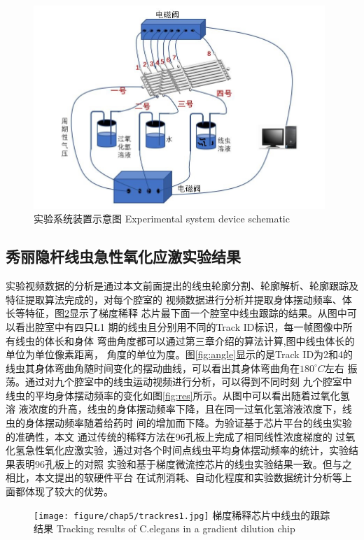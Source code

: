 	\begin{figure}[!t]
	  \centering
	  \includegraphics[width=11cm]{figure/chap5/hardware.jpg}
	  \bicaption
		{实验系统装置示意图}
		{Experimental system device schematic}
	  \label{fig:sysdevice}
	\end{figure}

\subsection{秀丽隐杆线虫急性氧化应激实验结果}
	实验视频数据的分析是通过本文前面提出的线虫轮廓分割、轮廓解析、轮廓跟踪及特征提取算法完成的，对每个腔室的
	视频数据进行分析并提取身体摆动频率、体长等特征，图\ref{fig:trackres}显示了梯度稀释
	芯片最下面一个腔室中线虫跟踪的结果。从图中可以看出腔室中有四只L1
	期的线虫且分别用不同的Track ID标识，每一帧图像中所有线虫的体长和身体
	弯曲角度都可以通过第三章介绍的算法计算,图中线虫体长的单位为单位像素距离，
	角度的单位为度。图\ref{fig:angle}显示的是Track ID为2和4的
	线虫其身体弯曲角随时间变化的摆动曲线，可以看出其身体弯曲角在$180^\circ C$左右
	振荡。通过对九个腔室中的线虫运动视频进行分析，可以得到不同时刻
	九个腔室中线虫的平均身体摆动频率的变化如图\ref{fig:res}所示。从图中可以看出随着过氧化氢溶
	液浓度的升高，线虫的身体摆动频率下降，且在同一过氧化氢溶液浓度下，线虫的身体摆动频率随着给药时
	间的增加而下降。为验证基于芯片平台的线虫实验的准确性，本文
	通过传统的稀释方法在96孔板上完成了相同线性浓度梯度的
	过氧化氢急性氧化应激实验，通过对各个时间点线虫平均身体摆动频率的统计，实验结果表明96孔板上的对照
	实验和基于梯度微流控芯片的线虫实验结果一致。但与之相比，本文提出的软硬件平台
	在试剂消耗、自动化程度和实验数据统计分析等上面都体现了较大的优势。
	\begin{figure}[H]
	  \centering
	  \texttt{[image: figure/chap5/trackres1.jpg]}
	  \bicaption
		{梯度稀释芯片中线虫的跟踪结果}
		{Tracking results of C.elegans in a gradient dilution chip}
	  \label{fig:trackres}
	\end{figure}
	
